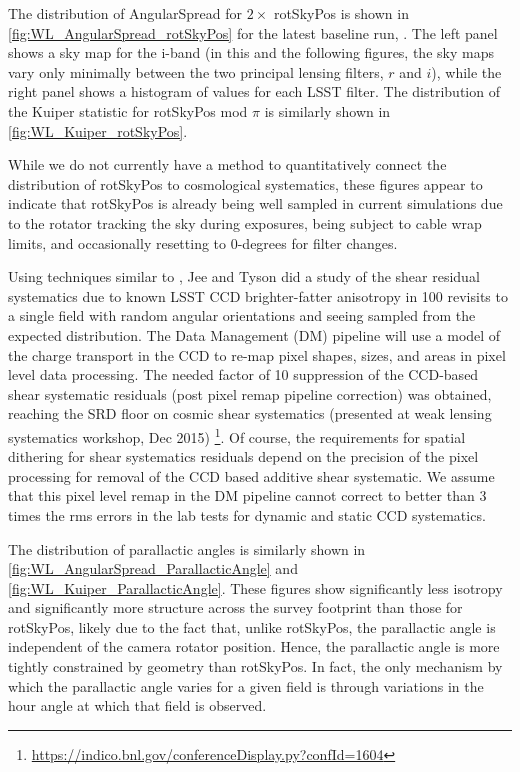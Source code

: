 The distribution of AngularSpread for $2 \times$ rotSkyPos is shown in
\autoref{fig:WL_AngularSpread_rotSkyPos} for the latest baseline \OpSim run,
.  The left panel shows a sky map for the i-band (in this and the
following figures, the sky maps vary only minimally between the two principal
lensing filters, $r$ and $i$), while the right panel shows a histogram of values
for each LSST filter.  The distribution of the Kuiper statistic for rotSkyPos
mod $\pi$ is similarly shown in \autoref{fig:WL_Kuiper_rotSkyPos}.

While we do not currently have a method to quantitatively connect the
distribution of rotSkyPos to cosmological systematics, these figures appear to
indicate that rotSkyPos is already being well sampled in current simulations due
to the rotator tracking the sky during exposures, being subject to cable wrap
limits, and occasionally resetting to 0-degrees for filter changes.

Using techniques similar to \citet{Jee&Tyson2011}, Jee and Tyson did a study of
the shear residual systematics due to known LSST CCD brighter-fatter anisotropy
in 100 revisits to a single field with random angular orientations and seeing
sampled from the expected distribution.  The Data Management (DM) pipeline will
use a model of the charge transport in the CCD to re-map pixel shapes, sizes,
and areas in pixel level data processing.  The needed factor of 10 suppression
of the CCD-based shear systematic residuals (post pixel remap pipeline
correction) was obtained, reaching the SRD floor on cosmic shear systematics
(presented at weak lensing systematics workshop, Dec 2015)
\footnote{\url{https://indico.bnl.gov/conferenceDisplay.py?confId=1604}}.  Of
course, the requirements for spatial dithering for shear systematics residuals
depend on the precision of the pixel processing for removal of the CCD based
additive shear systematic.  We assume that this pixel level remap in the DM
pipeline cannot correct to better than 3 times the rms errors in the lab tests
for dynamic and static CCD systematics.

The distribution of parallactic angles is similarly shown in
\autoref{fig:WL_AngularSpread_ParallacticAngle} and
\autoref{fig:WL_Kuiper_ParallacticAngle}.  These figures show significantly less
isotropy and significantly more structure across the survey footprint than those
for rotSkyPos, likely due to the fact that, unlike rotSkyPos, the parallactic
angle is independent of the camera rotator position.  Hence, the parallactic
angle is more tightly constrained by geometry than rotSkyPos.  In fact, the only
mechanism by which the parallactic angle varies for a given field is through
variations in the hour angle at which that field is observed.

